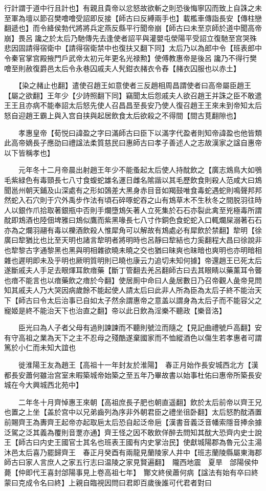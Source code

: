行計謂于道中行且計也】有親且貴帝以忿怒故欲斬之則恐後悔寧囚而致上自誅之未至軍為壇以節召樊噲噲受詔即反接【師古曰反縛兩手也】載檻車傳詣長安【傳柱戀翻遞也】而令絳侯勃代將將兵定燕反縣平行聞帝崩【師古曰未至京師於道中聞高帝崩】畏呂讒之於太后乃馳傳先去逢使者詔平與灌嬰屯滎陽平受詔立復馳至宫哭殊悲因固請得宿衛中【請得宿衛禁中也復扶又翻下同】太后乃以為郎中令【班表郎中令秦官掌宫殿掖門戶武帝太初元年更名光禄勲】使傅教惠帝是後呂讒乃不得行樊噲至則赦復爵邑太后令永巷囚戚夫人髠鉗衣赭衣令舂【赭衣囚服也以赤土】

　　【染之赭止也翻】遣使召趙王如意使者三反趙相周昌謂使者曰高帝屬臣趙王【屬之欲翻】王年少【少詩照翻下同】竊聞太后怨戚夫人欲召趙王并誅之臣不敢遣王王且亦病不能奉詔太后怒先使人召昌昌至長安乃使人復召趙王王來未到帝知太后怒自迎趙王霸上與入宫自挟與起居飲食太后欲殺之不得間【間古莧翻隙也】

　　孝惠皇帝【荀悦曰諱盈之字曰滿師古曰臣下以滿字代盈者則知帝諱盈也他皆類此高帝嫡長子應劭曰禮諡法柔質慈民曰惠師古曰孝子善述人之志故漢家之諡自惠帝以下皆稱孝也】

　　元年冬十二月帝晨出射趙王年少不能蚤起太后使人持酖飲之【廣志鴆鳥大如鴞毛紫緑色有毒頸長七八寸食蝮蛇雄名運日雌名隂諧以其毛歷飲食則殺人范咸大曰鴆聞邕州朝天鋪及山深處有之形如鵶差大黑身赤目音如羯鼓唯食毒蛇遇蛇則鳴聲邦邦然蛇入石穴則于穴外禹步作法有頃石碎啄蛇吞之山有鴆草木不生秋冬之間脱羽往時人以銀作爪拾取著銀瓶中否則手爛墮鴆矢著人立死集於石石亦裂此禽至兇極毒所謂酖即鴆酒也陸佃埤雅曰鴆似鷹而紫黑喙長七八寸作銅色食蛇蛇入口輒爛屎溺著石石亦為之爛羽翮有毒以櫟酒飲殺人惟犀角可以解故有鴆處必有犀飲於禁翻】犂明【徐廣曰犂猶比也比至天明也諸言犂明者將明時也呂靜曰犂結也力奚翻程大昌曰徐說非也犂黎古字通黎黑也黑與明相雜欲曉未曉之交也猶曰昧爽也昧暗也爽明也亦明暗相雜也遲明即未及乎明也厥明質明則已曉也康云力追切未知何據】帝還趙王已死太后遂斷戚夫人手足去眼煇耳飲瘖藥【斷丁管翻去羌呂翻師古曰去其眼睛以藥薰耳令聾也瘖不能言也以瘖藥飲之瘖於今翻】使居厠中命曰人彘居數日乃召帝觀人彘帝見問知其戚夫人乃大哭因病歲餘不能起使人請太后曰此非人所為臣為太后子終不能治天下【師古曰令太后治事已自如太子然余謂惠帝之意盖以謂身為太后子而不能容父之寵姬是終不能治天下也治直之翻】帝以此日飲為淫樂不聽政【樂音洛】

　　臣光曰為人子者父母有過則諫諫而不聽則號泣而隨之【見記曲禮號戶高翻】安有守高祖之業為天下之主不忍母之殘酷遂棄國家而不恤縱酒色以傷生若孝惠者可謂篤於小仁而未知大誼也

　　徙淮陽王友為趙王【高祖十一年封友於淮陽】　春正月始作長安城西北方【漢都長安蕭何雖治宫室未暇築城帝始築之至五年乃畢故書以始事杜佑曰惠帝所築長安城在今大興城西北苑中】

　　二年冬十月齊悼惠王來朝【高祖庶長子肥也朝直遥翻】飲於太后前帝以齊王兄也置之上坐【盖於宫中以兄弟齒列為序非外朝君臣之禮坐徂卧翻】太后怒酌酖酒置前賜齊王為夀齊王起帝亦起取巵太后恐自起泛帝巵【漢書音義泛音幡索隱音捧余據泛駕之泛其義為覆則音覂亦通】齊王怪之因不敢飲佯醉去問知其酖大恐齊内史士說王【師古曰内史王國官士其名也班表王國有内史掌治民】使獻城陽郡為魯元公主湯沐邑太后喜乃罷歸齊王　春正月癸酉有兩龍見蘭陵家人井中【班志蘭陵縣屬東海郡師古曰家人言庶人之家五行志曰温陵之家見賢遍翻】　隴西地震　夏旱　郃陽侯仲薨【仲即代王喜封郃陽事見上卷高祖七年】　酇文終侯蕭何病【諡法有始有卒曰終蒙曰克成令名曰終】上親自臨視因問曰君即百歲後誰可代君者對曰

